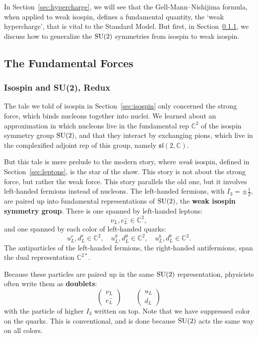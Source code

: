 \documentclass{article}
\newcommand{\C}{{\mathbb C}}  %
\newcommand{\SU}{{\rm SU}}    %
\renewcommand{\sl}{\mathfrak{sl}} %
\newcommand{\half}{\frac{1}{2}} %
\newcommand{\lep}{\left( \! \begin{array}{c} \nu_L \\ e^-_L \end{array} \! \right)} %
\newcommand{\quark}{\left( \! \begin{array}{c} u_L \\ d_L \end{array} \! \right)} %
\begin{document}
In Section~\ref{sec:hypercharge}, we will see that the Gell-Mann--Nishijima
formula, when applied to weak isospin, defines a fundamental quantity, the
`weak hypercharge', that is vital to the Standard Model. But first, in
Section~\ref{sec:redux}, we discuss how to generalize the $\SU(2)$ symmetries
from isospin to weak isospin.

\subsection{The Fundamental Forces} \label{sec:forces}

\subsubsection{Isospin and {\rm{SU(2)}}, Redux} \label{sec:redux}

The tale we told of isospin in Section~\ref{sec:isospin} only concerned
the strong force, which binds nucleons together into nuclei. We learned
about an approximation in which nucleons live in the fundamental rep $\C^2$ 
of the isospin symmetry group $\SU(2)$, and that they interact by exchanging 
pions, which live in the complexified adjoint rep of this group,
namely $\sl(2, \C)$.

But this tale is mere prelude to the modern story, where \emph{weak} isospin, 
defined in Section~\ref{sec:leptons}, is the star of the show.  This story
is not about the strong force, but rather the weak force.   This story
parallels the old one, but it involves left-handed fermions instead of nucleons.
The left-handed fermions, with $I_3 = \pm \half$, are paired up into
fundamental representations of $\SU(2)$, the \textbf{weak isospin symmetry
group}.  There is one spanned by left-handed leptons:
\[ \nu_L, e^-_L \in \C^2, \]
and one spanned by each color of left-handed quarks:
\[ u^r_L, d^r_L \in \C^2, \quad u^g_L, d^g_L \in \C^2, \quad 
u^b_L, d^b_L \in \C^2. \]
The antiparticles of the left-handed fermions, the right-handed antifermions,
span the dual representation $\C^{2*}$.

Because these particles are paired up in the same $\SU(2)$ representation,
physicists often write them as \textbf{doublets}:
\[ \lep \qquad \quark \]
with the particle of higher $I_3$ written on top. Note that we have suppressed
color on the quarks. This is conventional, and is done because $\SU(2)$ acts
the same way on all colors.
\end{document}
